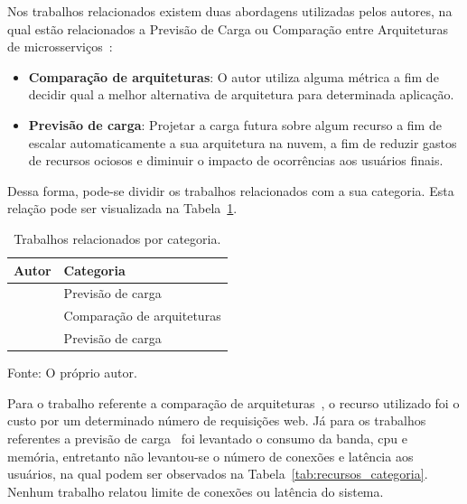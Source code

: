 Nos trabalhos relacionados existem duas abordagens utilizadas pelos autores, na qual estão relacionados a Previsão de Carga ou Comparação entre Arquiteturas de microsserviços~\cite{7515686, 6374456}:

\begin{itemize}
  \item \textbf{Comparação de arquiteturas}: O autor utiliza alguma métrica a fim de decidir qual a melhor alternativa de arquitetura para determinada aplicação.
  \item \textbf{Previsão de carga}: Projetar a carga futura sobre algum recurso a fim de escalar automaticamente a sua arquitetura na nuvem, a fim de reduzir gastos de recursos ociosos e diminuir o impacto de ocorrências aos usuários finais.
\end{itemize}

Dessa forma, pode-se dividir os trabalhos relacionados com a sua categoria.
%
Esta relação pode ser visualizada na Tabela~\ref{tab:categoria_trabalhos}.

\begin{table}[htb!]
\centering
\caption{Trabalhos relacionados por categoria.}
\label{tab:categoria_trabalhos}
\begin{tabular}{l|l}
\hline \hline
Autor & Categoria                            \\ \hline \hline
\cite{6374456}  & Previsão de carga          \\ \hline
\cite{7515686}  & Comparação de arquiteturas \\ \hline
\cite{1417630}  & Previsão de carga          \\ \hline \hline
\end{tabular}


Fonte: O próprio autor.
\end{table}

Para o trabalho referente a comparação de arquiteturas~\cite{7515686}, o recurso utilizado foi o custo por um determinado número de requisições web.
%
Já para os trabalhos referentes a previsão de carga~\cite{6374456, 1417630} foi levantado o consumo da banda, \ac{cpu} e memória, entretanto não levantou-se o número de conexões e latência aos usuários, na qual podem ser observados na Tabela~\ref{tab:recursos_categoria}.
%
Nenhum trabalho relatou limite de conexões ou latência do sistema.


